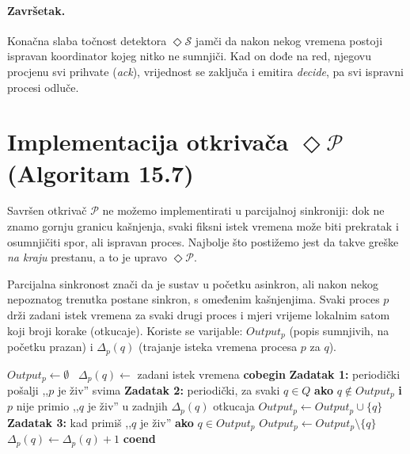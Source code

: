 \documentclass[11pt,a4paper]{article}
\newcommand{\Dp}{\ensuremath{\mathcal{P}}}
\newcommand{\eP}{\ensuremath{\Diamond\mathcal{P}}}
\newcommand{\eS}{\ensuremath{\Diamond\mathcal{S}}}
\begin{document}
\paragraph{Završetak.} Konačna slaba točnost detektora $\eS$ jamči da nakon nekog
vremena postoji ispravan koordinator kojeg nitko ne sumnjiči. Kad on dođe na red,
njegovu procjenu svi prihvate (\textit{ack}), vrijednost se zaključa i emitira
\textit{decide}, pa svi ispravni procesi odluče.

\section{Implementacija otkrivača \eP{} (Algoritam 15.7)}
\label{sec:fd}

Savršen otkrivač \Dp{} ne možemo implementirati u parcijalnoj sinkroniji: dok ne
znamo gornju granicu kašnjenja, svaki fiksni istek vremena može biti prekratak i
osumnjičiti spor, ali ispravan proces. Najbolje što postižemo jest da takve
greške \emph{na kraju} prestanu, a to je upravo \eP.

Parcijalna sinkronost znači da je sustav u početku asinkron, ali nakon nekog
nepoznatog trenutka postane sinkron, s omeđenim kašnjenjima. Svaki proces $p$
drži zadani istek vremena za svaki drugi proces i mjeri vrijeme lokalnim satom
koji broji korake (otkucaje). Koriste se varijable: $Output_p$ (popis sumnjivih,
na početku prazan) i $\Delta_p(q)$ (trajanje isteka vremena procesa $p$ za $q$).

\begin{algorithm}[h]
\caption{Timeout implementacija $D \in \eP$ u modelu parcijalne sinkronosti
(svaki proces $p$)}
\label{alg:eP}
\begin{algorithmic}[1]
\State $Output_p \gets \emptyset$
\ $\Delta_p(q) \gets$ zadani istek vremena \EndFor
\Statex \textbf{cobegin}
\Statex \textbf{Zadatak 1:} periodički
  \State \quad pošalji ,,$p$ je živ'' svima
\Statex \textbf{Zadatak 2:} periodički, za svaki $q \in Q$
  \State \quad \textbf{ako} $q \notin Output_p$ \textbf{i} $p$ nije primio
  ,,$q$ je živ'' u zadnjih $\Delta_p(q)$ otkucaja
  \State \qquad $Output_p \gets Output_p \cup \{q\}$
\Statex \textbf{Zadatak 3:} kad primiš ,,$q$ je živ''
  \State \quad \textbf{ako} $q \in Output_p$
  \State \qquad $Output_p \gets Output_p \setminus \{q\}$
  \State \qquad $\Delta_p(q) \gets \Delta_p(q) + 1$
\Statex \textbf{coend}
\end{algorithmic}
\end{algorithm}
\end{document}
